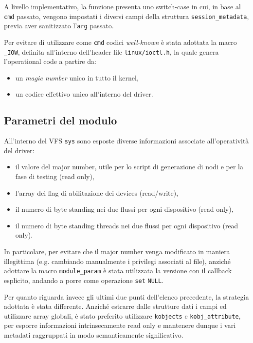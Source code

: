 \documentclass{article}
\begin{document}
A livello implementativo, la funzione presenta uno switch-case in cui, in base al \texttt{cmd} passato, vengono impostati i diversi campi della struttura \texttt{session\_metadata}, previa aver sanitizzato l'\texttt{arg} passato.

Per evitare di utilizzare come \texttt{cmd} codici \textit{well-known} è stata adottata la macro \texttt{\_IOW}, definita all'interno dell'header file \texttt{linux/ioctl.h}, la quale genera l'operational code a partire da:
\begin{itemize}
        \item un \textit{magic number} unico in tutto il kernel,
        \item un codice effettivo unico all'interno del driver.
\end{itemize}

\subsection{Parametri del modulo}
All'interno del VFS \texttt{sys} sono esposte diverse informazioni associate all'operatività del driver:
\begin{itemize}
        \item il valore del major number, utile per lo script di generazione di nodi e per la fase di testing (read only),
        \item l'array dei flag di abilitazione dei devices (read/write),
        \item il numero di byte standing nei due flussi per ogni dispositivo (read only),
        \item il numero di byte standing threads nei due flussi per ogni dispositivo (read only).
\end{itemize}

In particolare, per evitare che il major number venga modificato in maniera illegittima (e.g. cambiando manualmente i privilegi associati al file), anziché adottare la macro \texttt{module\_param} è stata utilizzata la versione con il callback esplicito, andando a porre come operazione \texttt{set} \texttt{NULL}.

Per quanto riguarda invece gli ultimi due punti dell'elenco precedente, la strategia adottata è stata differente. Anziché estrarre dalle strutture dati i campi ed utilizzare array globali, è stato preferito utilizzare \texttt{kobjects} e \texttt{kobj\_attribute}, per esporre informazioni intrinsecamente read only e mantenere dunque i vari metadati raggruppati in modo semanticamente significativo.
\end{document}
